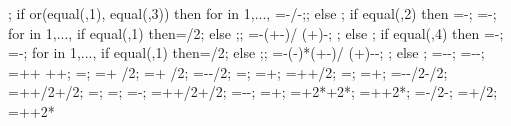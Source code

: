 {{{};
if or(equal(\latloadtype,1), equal(\latloadtype,3)) then {
for \iarr in {1,...,{\levelnumber}}{
	\arrstartx{\iarr}=-\toparrlen*\y{\iarr}/\structheight-\latloadshift;};
} else {};
if equal(\latloadtype,2) then {
	=-\latloadshift;
	=-\isomidy;
	for \iarr in {1,...,{\levelnumber}}{
		if equal(\iarr,1) then{\addtempy=\supportheight/2;} else {;};
		\arrstartx{\iarr}=-\toparrlen*(\y{\iarr}+\isomidy-\addtempy)/
		(\structheight+\isomidy)-\latloadshift;
	};
} else {};
if equal(\latloadtype,4) then {
	=-\latloadshift;
	=-\isomidy;
	for \iarr in {1,...,{\levelnumber}}{
		if equal(\iarr,1) then{\addtempy=\supportheight/2;} else {;};
		\arrstartx{\iarr}=-(\toparrlen-\basearrlen)*(\y{\iarr}+\isomidy-\addtempy)/
		(\structheight+\isomidy)-\latloadshift-\basearrlen;
	};
} else {};
\engbedrockstartx=-\leftsoildist-\engbedrockleftdist;
\engbedrockstarty=-\soilbelowfoundtof-\engbedrockdepth;
\engbedrockdeltax=\leftsoildist+\engbedrockleftdist+
  \buildingwidth+\rightsoildist+\engbedrockrightdist;
\engbedrockdeltay=\engbedrockdepth;
\engbedrockmidx=\engbedrockstartx + \engbedrockdeltax/2;
\engbedrockmidy=\engbedrockstarty + \engbedrockdeltay/2;
\translayerleftstartx=-\leftsoildist-\translayerlinet/2;
\translayerleftstarty=\basewalldepth;
\translayerleftdeltay=\basewalldepth+\soilbelowfoundtof;
\translayerrightstartx=\rightsoildist+\buildingwidth+\translayerlinet/2;
\translayerrightstarty=\basewalldepth;
\translayerrightdeltay=\basewalldepth+\soilbelowfoundtof;
\ssinterleftstartx=-\supportwidth-\baselinet/2-\ssinterlinet/2;
\ssinterrightstartx=\buildingwidth+\supportwidth+\baselinet/2+\ssinterlinet/2;
\ssinterleftstarty=\basewalldepth;
\ssinterrightstarty=\basewalldepth;
\ssinterdeltax=\ssinterrightstartx-\ssinterleftstartx;
\ssinterdeltay=\basewalldepth+\supportheight+\baselinet/2+\ssinterlinet/2;
\markssleftstartx=-\supportwidth-\markssexspace;
\markssleftstarty=\basewalldepth+\markssexspace;
\markssdeltax=\buildingwidth+2*\supportwidth+2*\markssexspace;
\markssdeltay=\basewalldepth+\supportheight+2*\markssexspace;
\supershadestartx=-\collinet/2-\supershadespace;
\supershadestarty=\basewalldepth+\baselinet/2;
\supershadedeltax=\buildingwidth+\collinet+2*\supershadespace
}}
